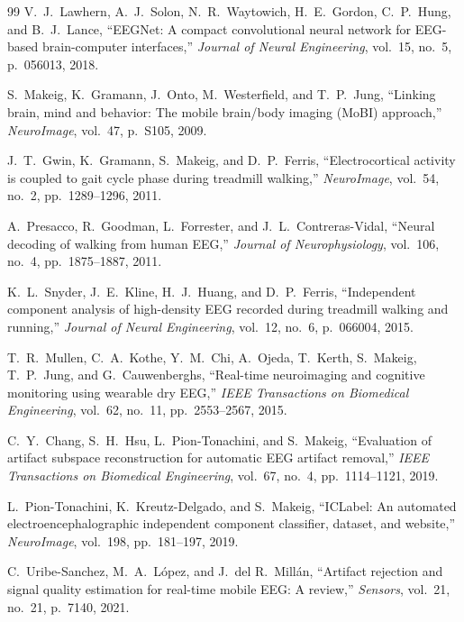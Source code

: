 \documentclass[11pt,a4paper]{article}
\begin{document}
\begin{thebibliography}{99}
V.~J.~Lawhern, A.~J.~Solon, N.~R.~Waytowich, H.~E.~Gordon, C.~P.~Hung, and B.~J.~Lance, ``EEGNet: A compact convolutional neural network for EEG-based brain-computer interfaces,'' \textit{Journal of Neural Engineering}, vol.~15, no.~5, p.~056013, 2018.

S.~Makeig, K.~Gramann, J.~Onto, M.~Westerfield, and T.~P.~Jung, ``Linking brain, mind and behavior: The mobile brain/body imaging (MoBI) approach,'' \textit{NeuroImage}, vol.~47, p.~S105, 2009.

J.~T.~Gwin, K.~Gramann, S.~Makeig, and D.~P.~Ferris, ``Electrocortical activity is coupled to gait cycle phase during treadmill walking,'' \textit{NeuroImage}, vol.~54, no.~2, pp.~1289--1296, 2011.

A.~Presacco, R.~Goodman, L.~Forrester, and J.~L.~Contreras-Vidal, ``Neural decoding of walking from human EEG,'' \textit{Journal of Neurophysiology}, vol.~106, no.~4, pp.~1875--1887, 2011.

K.~L.~Snyder, J.~E.~Kline, H.~J.~Huang, and D.~P.~Ferris, ``Independent component analysis of high-density EEG recorded during treadmill walking and running,'' \textit{Journal of Neural Engineering}, vol.~12, no.~6, p.~066004, 2015.

T.~R.~Mullen, C.~A.~Kothe, Y.~M.~Chi, A.~Ojeda, T.~Kerth, S.~Makeig, T.~P.~Jung, and G.~Cauwenberghs, ``Real-time neuroimaging and cognitive monitoring using wearable dry EEG,'' \textit{IEEE Transactions on Biomedical Engineering}, vol.~62, no.~11, pp.~2553--2567, 2015.

C.~Y.~Chang, S.~H.~Hsu, L.~Pion-Tonachini, and S.~Makeig, ``Evaluation of artifact subspace reconstruction for automatic EEG artifact removal,'' \textit{IEEE Transactions on Biomedical Engineering}, vol.~67, no.~4, pp.~1114--1121, 2019.

L.~Pion-Tonachini, K.~Kreutz-Delgado, and S.~Makeig, ``ICLabel: An automated electroencephalographic independent component classifier, dataset, and website,'' \textit{NeuroImage}, vol.~198, pp.~181--197, 2019.

C.~Uribe-Sanchez, M.~A.~L\'{o}pez, and J.~del R.~Mill\'{a}n, ``Artifact rejection and signal quality estimation for real-time mobile EEG: A review,'' \textit{Sensors}, vol.~21, no.~21, p.~7140, 2021.


\end{thebibliography}
\end{document}
